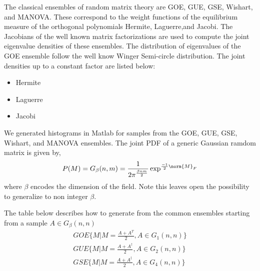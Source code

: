 The classical ensembles of random matrix theory are GOE, GUE, GSE, Wishart, and MANOVA. These correspond to the weight functions of the equilibrium measure of the orthogonal polynomials Hermite, Laguerre,and Jacobi.  The Jacobians of the well known matrix factorizations are used to compute the joint eigenvalue densities of these ensembles. The distribution of eigenvalues of the GOE ensemble follow the well know Winger Semi-circle distribution.
The joint densities up to a constant factor are listed below:
\begin{itemize}
  \item Hermite  \item Laguerre   \item Jacobi
\end{itemize}
We generated histograms in Matlab for samples from the GOE, GUE, GSE, Wishart, and MANOVA ensembles.
The joint PDF of a generic Gaussian ramdom matrix is given by,
\begin{equation*}
P(M)=G_\beta(n,m)=\frac{1}{2 \pi^{\frac{\beta n m}{2} }} \exp^{\frac{-1}{2}\norm{M}_F }
\end{equation*} where $\beta$ encodes the dimension of the field.  Note this leaves open the possibility to
generalize to non integer $\beta$.

The table below describes how to generate from the common ensembles starting from a sample $A \in G_\beta(n,n)$
\begin{eqnarray*}
    GOE  \{ M | M = \frac{A+A^T}{2}, A \in G_1(n,n)\}\\ %
    GUE  \{ M | M = \frac{A+A^\dagger}{2}, A \in G_2(n,n)\}\\ %
    GSE  \{ M | M = \frac{A+A^\ddagger}{2}, A \in G_4(n,n)\} %
\end{eqnarray*}


